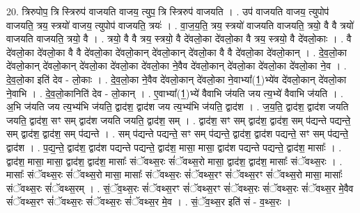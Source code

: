 \documentclass[17pt]{extarticle}
\begin{document}
20. त्रिरुपोप॒ त्रि स्त्रिरुप॑ वाजयति वाजय॒ त्युप॒ त्रि स्त्रिरुप॑ वाजयति । . उप॑ वाजयति वाजय॒ त्युपोप॑ वाजयति॒ त्रय॒ स्त्रयो॑ वाजय॒ त्युपोप॑ वाजयति॒ त्रयः॑ । . वा॒ज॒य॒ति॒ त्रय॒ स्त्रयो॑ वाजयति वाजयति॒ त्रयो॒ वै वै त्रयो॑ वाजयति वाजयति॒ त्रयो॒ वै । . त्रयो॒ वै वै त्रय॒ स्त्रयो॒ वै दे॑वलो॒का दे॑वलो॒का वै त्रय॒ स्त्रयो॒ वै दे॑वलो॒काः । . वै दे॑वलो॒का दे॑वलो॒का वै वै दे॑वलो॒का दे॑वलो॒कान् दे॑वलो॒कान् दे॑वलो॒का वै वै दे॑वलो॒का दे॑वलो॒कान् । . दे॒व॒लो॒का दे॑वलो॒कान् दे॑वलो॒कान् दे॑वलो॒का दे॑वलो॒का दे॑वलो॒का ने॒वैव दे॑वलो॒कान् दे॑वलो॒का दे॑वलो॒का दे॑वलो॒का ने॒व । . दे॒व॒लो॒का इति॑ देव - लो॒काः । . दे॒व॒लो॒का ने॒वैव दे॑वलो॒कान् दे॑वलो॒का ने॒वाभ्या᳚(1॒)भ्ये॑व दे॑वलो॒कान् दे॑वलो॒का ने॒वाभि । . दे॒व॒लो॒कानिति॑ देव - लो॒कान् । . ए॒वाभ्या᳚(1॒)भ्ये॑ वैवाभि ज॑यति जय त्य॒भ्ये॑ वैवाभि ज॑यति । . अ॒भि ज॑यति जय त्य॒भ्य॑भि ज॑यति॒ द्वाद॑श॒ द्वाद॑श जय त्य॒भ्य॑भि ज॑यति॒ द्वाद॑श । . ज॒य॒ति॒ द्वाद॑श॒ द्वाद॑श जयति जयति॒ द्वाद॑श॒ सꣳ सम् द्वाद॑श जयति जयति॒ द्वाद॑श॒ सम् । . द्वाद॑श॒ सꣳ सम् द्वाद॑श॒ द्वाद॑श॒ सम् प॑द्यन्ते पद्यन्ते॒ सम् द्वाद॑श॒ द्वाद॑श॒ सम् प॑द्यन्ते । . सम् प॑द्यन्ते पद्यन्ते॒ सꣳ सम् प॑द्यन्ते॒ द्वाद॑श॒ द्वाद॑श पद्यन्ते॒ सꣳ सम् प॑द्यन्ते॒ द्वाद॑श । . प॒द्य॒न्ते॒ द्वाद॑श॒ द्वाद॑श पद्यन्ते पद्यन्ते॒ द्वाद॑श॒ मासा॒ मासा॒ द्वाद॑श पद्यन्ते पद्यन्ते॒ द्वाद॑श॒ मासाः᳚ । . द्वाद॑श॒ मासा॒ मासा॒ द्वाद॑श॒ द्वाद॑श॒ मासाः᳚ संॅवथ्स॒रः सं॑ॅवथ्स॒रो मासा॒ द्वाद॑श॒ द्वाद॑श॒ मासाः᳚ संॅवथ्स॒रः । . मासाः᳚ संॅवथ्स॒रः सं॑ॅवथ्स॒रो मासा॒ मासाः᳚ संॅवथ्स॒रः सं॑ॅवथ्स॒रꣳ सं॑ॅवथ्स॒रꣳ सं॑ॅवथ्स॒रो मासा॒ मासाः᳚ संॅवथ्स॒रः सं॑ॅवथ्स॒रम् । . सं॒ॅव॒थ्स॒रः सं॑ॅवथ्स॒रꣳ सं॑ॅवथ्स॒रꣳ सं॑ॅवथ्स॒रः सं॑ॅवथ्स॒रः सं॑ॅवथ्स॒र मे॒वैव सं॑ॅवथ्स॒रꣳ सं॑ॅवथ्स॒रः सं॑ॅवथ्स॒रः सं॑ॅवथ्स॒र मे॒व । . सं॒ॅव॒थ्स॒र इति॑ सं - व॒थ्स॒रः । \newline
\end{document}
